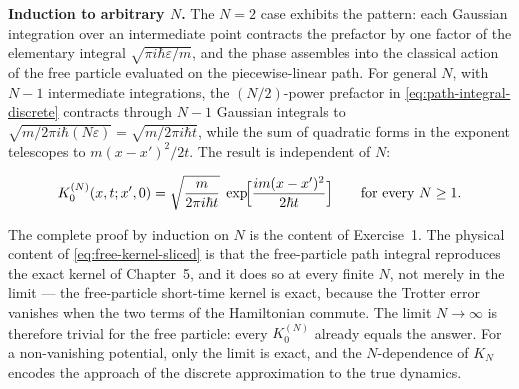 \medskip\noindent\textbf{Induction to arbitrary $N$.} The $N=2$ case exhibits the pattern: each Gaussian integration over an intermediate point contracts the prefactor by one factor of the elementary integral $\sqrt{\pi i\hbar\varepsilon/m}$, and the phase assembles into the classical action of the free particle evaluated on the piecewise-linear path. For general $N$, with $N-1$ intermediate integrations, the $(N/2)$-power prefactor in \eqref{eq:path-integral-discrete} contracts through $N-1$ Gaussian integrals to $\sqrt{m/2\pi i\hbar(N\varepsilon)} = \sqrt{m/2\pi i\hbar t}$, while the sum of quadratic forms in the exponent telescopes to $m(x-x')^2/2t$. The result is independent of $N$:
\begin{linenomath}
\begin{equation}
K_0^{(N)}(x,t;x',0) = \sqrt{\frac{m}{2\pi i\hbar t}}\;
\exp\!\Bigl[\frac{im(x-x')^2}{2\hbar t}\Bigr]
\qquad\text{for every } N \geq 1 .
\label{eq:free-kernel-sliced}
\end{equation}
\end{linenomath}
The complete proof by induction on $N$ is the content of Exercise~1. The physical content of \eqref{eq:free-kernel-sliced} is that the free-particle path integral reproduces the exact kernel of Chapter~5, and it does so at every finite $N$, not merely in the limit --- the free-particle short-time kernel is exact, because the Trotter error vanishes when the two terms of the Hamiltonian commute. The limit $N \to \infty$ is therefore trivial for the free particle: every $K_0^{(N)}$ already equals the answer. For a non-vanishing potential, only the limit is exact, and the $N$-dependence of $K_N$ encodes the approach of the discrete approximation to the true dynamics.

